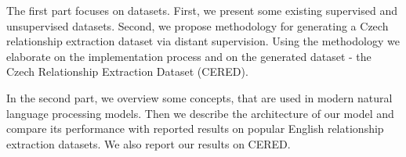 The first part focuses on datasets. First, we present some existing supervised and unsupervised datasets. Second, we propose methodology for generating a Czech relationship extraction dataset via distant supervision. Using the methodology we elaborate on the implementation process and on the generated dataset - the Czech Relationship Extraction Dataset (CERED).

In the second part, we overview some concepts, that are used in modern natural language processing models. Then we describe the architecture of our model and compare its performance with reported results on popular English relationship extraction datasets. We also report our results on CERED. 
